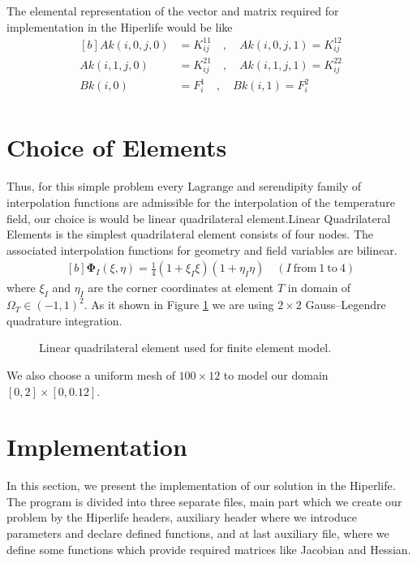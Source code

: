 \documentclass[]{article}
\begin{document}
The elemental representation of the vector and matrix required for implementation in the Hiperlife would be
like
\begin{equation}\label{eq14}
	\begin{aligned}[b]
		Ak(i,0,j,0)&=K^{11}_{ij} \quad , \quad Ak(i,0,j,1)=K^{12}_{ij}\\
		Ak(i,1,j,0)&=K^{21}_{ij}\quad , \quad Ak(i,1,j,1)=K^{22}_{ij} \\
		Bk(i,0)&=F^{1}_{i} \quad , \quad 		Bk(i,1)=F^{2}_{i}\\
	\end{aligned}
\end{equation}
\section{Choice of Elements} \label{sec: coe}
Thus, for this simple problem every Lagrange and serendipity family of interpolation functions are admissible for the interpolation of the temperature field, our choice is would be linear quadrilateral element.Linear  Quadrilateral Elements is the simplest quadrilateral element consists of four nodes. The associated interpolation functions for geometry and ﬁeld variables are bilinear.
\begin{equation}\label{eq15}
	\begin{aligned}[b]
		\boldsymbol{\Phi}_{I}(\xi, \eta) = \frac{1}{4}(1+\xi_I\xi)(1+\eta_I\eta) \quad (I \ \text{from} \ 1 \ \text{to} \ 4)
	\end{aligned}
\end{equation}
where $\xi_{I}$ and $\eta_{I}$ are the corner coordinates at element $T$ in domain of $\Omega_{T} \in (-1,1)^2$. As it shown in Figure \ref{fig_el} we are using $2 \times 2$ Gauss–Legendre quadrature integration.
\begin{figure}[htbp]
	\centering
	
	\caption{Linear quadrilateral element used for finite element model.}
	\label{fig_el}
\end{figure}

We also choose a uniform mesh of $100 \times 12$ to model our domain $[0,2] \times[0,0.12]$.
\section{Implementation} \label{sec: im}
In this section, we present the implementation of our solution in the Hiperlife. The program is divided into three separate files, main part which we create our problem by the Hiperlife headers, auxiliary header where we introduce parameters and declare defined functions, and at last auxiliary file, where we define some functions which provide required matrices like Jacobian and Hessian.
\end{document}
